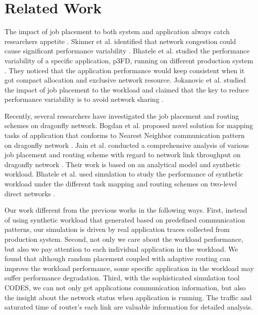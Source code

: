 \documentclass[conference,compsoc]{IEEEtran}
\begin{document}
\section{Related Work}
\label{sec:related work}

The impact of job placement to both system and application always catch researchers appetite \cite{dskinner} \cite{abhinav-sc13} \cite{jose-ipdps15}. Skinner et al. identified that network congestion could cause significant performance variability \cite{dskinner}. Bhatele et al. studied the performance variability of a specific application, p3FD, running on different production system \cite{abhinav-sc13}. They noticed that the application performance would keep consistent when it got compact allocation and exclusive network resource. Jokanovic et al. studied the impact of job placement to the workload and claimed that the key to reduce performance variability is to avoid network sharing \cite{jose-ipdps15}. 

Recently, several researchers have investigated the job placement and routing schemes on dragonfly network. Bogdan et al. proposed novel solution for mapping tasks of application that conforms to Nearest Neighbor communication pattern on dragonfly network \cite{hoefler-hpdc14}. Jain et al. conducted a comprehensive analysis of various job placement and routing scheme with regard to network link throughput on dragonfly network \cite{jain-sc14}. Their work is based on an analytical model and synthetic workload. Bhatele et al. used simulation to study the performance of synthetic workload under the different task mapping and routing schemes on two-level direct networks \cite{bhatele-sc11}.


Our work different from the previous works in the following ways. First, instead of using synthetic workload that generated based on predefined communication patterns, our simulation is driven by real application traces collected from production system. Second, not only we care about the workload performance, but also we pay attention to each individual application in the workload. We found that although random placement coupled with adaptive routing can improve the workload performance, some specific application in the workload may suffer performance degradation. Third, with the sophisticated simulation tool CODES, we can not only get applications communication information, but also the insight about the network status when application is running. The traffic and saturated time of router's each link are valuable information for detailed analysis.
\end{document}

